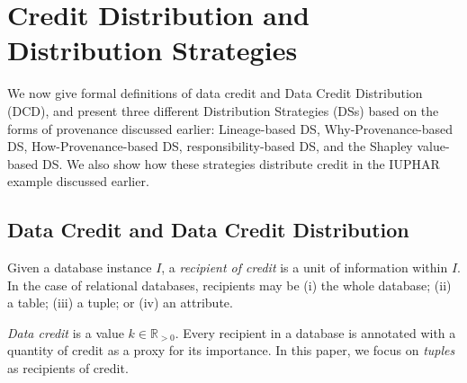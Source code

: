 \documentclass[preprint,12pt,sort&compress]{elsarticle}
\newcommand{\rtwo}[1]{\textcolor{reviewer2}{#1}}
\newcommand{\eat}[1]{}
\begin{document}
%

\section{Credit Distribution and Distribution Strategies}
\label{section:distribution_strategies}
We now give formal definitions of data credit and Data Credit Distribution (DCD), and present three different Distribution Strategies (DSs) based on the forms of provenance discussed earlier:  Lineage-based DS, Why-Provenance-based DS, How-Provenance-based DS, \rtwo{ responsibility-based DS, and the Shapley value-based DS}.  We also show how these strategies distribute credit in the IUPHAR example discussed earlier.


\subsection{Data Credit and Data Credit Distribution}
Given a database instance $I$, a \emph{recipient of credit} is a unit of information within $I$. In the case of relational databases, recipients may be (i) the whole database; (ii) a table; (iii) a tuple; or (iv) an attribute.

\emph{Data credit} is a value $k \in \mathbb{R}_{>0}$. 
Every recipient in a database is annotated with a quantity of credit as a proxy for its importance. In this paper, we focus on {\em tuples} as recipients of credit. 

\eat{\emph{Data Credit Distribution} (DCD) considers a database instance $I$, a certain quantity of credit $k$ (here, without loss of generality, deemed to be given), 
and a query $Q$ producing a result set $Q(I)$.  
DCD consists of defining a function, i.e., a \emph{distribution strategy} (DS), to split credit into portions to be assigned to the tuples in $I$.}
\end{document}
